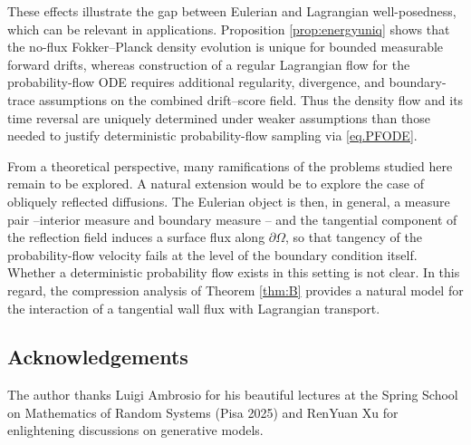 \documentclass[11pt]{amsart}
\theoremstyle{definition}
\begin{document}
These effects illustrate the gap between Eulerian and Lagrangian well-posedness, which can be relevant in applications. Proposition \ref{prop:energyuniq} shows that the no-flux Fokker–Planck density evolution is unique for bounded measurable forward drifts, whereas construction of a regular Lagrangian flow for the probability-flow ODE requires additional regularity, divergence, and boundary-trace assumptions on the combined drift–score field. Thus the density flow and  its time reversal are uniquely determined under weaker assumptions than those needed to justify deterministic probability-flow sampling
via \eqref{eq.PFODE}.


From a theoretical perspective, many ramifications of the problems studied here remain to be explored.
A natural extension would be  to explore the case of obliquely reflected diffusions.
The Eulerian object is then, in general, a measure pair --interior
measure and boundary measure \cite{HarrisonWilliams,KangRamananStat}-- and the
tangential component of the reflection field induces a surface flux
along $\partial\Omega$, so that tangency of the probability-flow
velocity fails at the level of the boundary condition itself.
Whether a deterministic probability flow exists
in this setting is not clear. In this regard, the compression analysis of Theorem
\ref{thm:B} provides a natural model for the interaction of a
tangential wall flux with Lagrangian transport.



\subsection*{Acknowledgements} The author thanks Luigi Ambrosio for his beautiful lectures at the Spring School on Mathematics of Random Systems (Pisa 2025)  and RenYuan Xu for enlightening discussions on generative models. 

\end{document}
